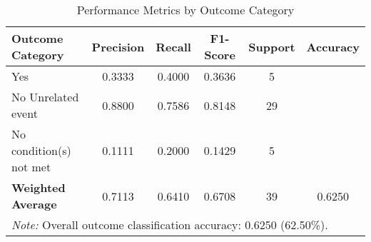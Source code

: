 \begin{table}[!ht]
\centering
\caption{Performance Metrics by Outcome Category}
\label{tab:classification_metrics}
\begin{tabular}{lccccc}
\toprule
\textbf{Outcome Category} & \textbf{Precision} & \textbf{Recall} & \textbf{F1-Score} & \textbf{Support} & \textbf{Accuracy} \\
\midrule
Yes & 0.3333 & 0.4000 & 0.3636 & 5 & \multirow{1}{*}{} \\
No \- Unrelated event & 0.8800 & 0.7586 & 0.8148 & 29 & \multirow{1}{*}{} \\
No \- condition(s) not met & 0.1111 & 0.2000 & 0.1429 & 5 & \multirow{1}{*}{} \\
\midrule
\textbf{Weighted Average} & 0.7113 & 0.6410 & 0.6708 & 39 & 0.6250 \\
\bottomrule
\multicolumn{6}{p{14cm}}{\textit{Note:} Overall outcome classification accuracy: 0.6250 (62.50\%).} \\
\end{tabular}
\end{table}
